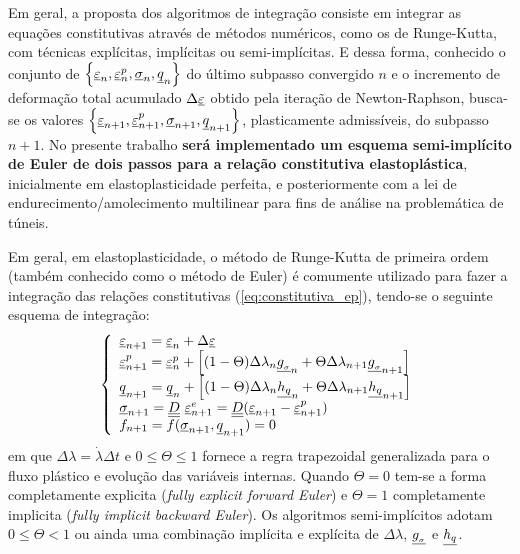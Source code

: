 Em geral, a proposta dos algoritmos de integração consiste em integrar as equações constitutivas através de métodos numéricos, como os de Runge-Kutta, com técnicas explícitas, implícitas ou semi-implícitas. E dessa forma, conhecido o conjunto de $\left\{ \underline{\varepsilon}_n, \underline{\varepsilon}_n^p,\underline \sigma_n,\underline q_n \right\}$ do último subpasso convergido $n$ e o incremento de deformação total acumulado $\Delta \underline{\varepsilon}$ obtido pela iteração de Newton-Raphson, busca-se os valores $\left\{ \underline{\varepsilon}_{n+1}, \underline{\varepsilon}_{n+1}^p,\underline \sigma_{n+1},\underline q_{n+1} \right\}$, plasticamente admissíveis, do subpasso $n+1$. No presente trabalho \textbf{será implementado um esquema semi-implícito de Euler de dois passos para a relação constitutiva elastoplástica}, inicialmente em elastoplasticidade perfeita, e posteriormente com a lei de endurecimento/amolecimento multilinear para fins de análise na problemática de túneis.

Em geral, em elastoplasticidade, o método de Runge-Kutta de primeira ordem (também conhecido como o método de Euler) é comumente utilizado para fazer a integração das relações constitutivas (\ref{eq:constitutiva_ep}), tendo-se o seguinte esquema de integração:
\begin{equation}
	\label{eq:esquema_int_constitutiva_ep}
	\left\{
	\begin{array}{lcl}
		\underline{\varepsilon}_{n+1} = \underline{\varepsilon}_n + \Delta \underline{\varepsilon} \\
		\underline{\varepsilon}_{n+1}^p = \underline{\varepsilon}_n^p + \left[(1-\Theta) \Delta \lambda_n \underline{g_{_\sigma}}_n + \Theta \Delta \lambda_{n+1} \underline{g_{_\sigma}}_{n+1}\right] \\
		\underline q_{n+1} = \underline q_n + \left[(1-\Theta) \Delta \lambda_n \underline{h_q}_n + \Theta \Delta \lambda_{n+1} \underline{h_q}_{n+1}\right] \\	
		\underline \sigma_{n+1} = \underline{\underline D}~\underline{\varepsilon}_{n+1}^e = \underline{\underline D}( \underline{\varepsilon}_{n+1} - \underline{\varepsilon}_{n+1}^p) \\
		f_{n+1} = f(\underline \sigma_{n+1},\underline q_{n+1}) = 0		
	\end{array}
	\right.
\end{equation}
em que $\Delta \lambda = \dot\lambda\Delta t$ e $0 \leq \Theta \leq 1$ fornece a regra trapezoidal generalizada para o fluxo plástico e evolução das variáveis internas. Quando $\Theta = 0$ tem-se a forma completamente explicita (\textit{fully explicit forward Euler}) e $\Theta = 1$  completamente implicita (\textit{fully implicit backward Euler}). Os algoritmos semi-implícitos adotam $0 \leq \Theta < 1$  ou ainda uma combinação implícita e explícita de $\Delta \lambda$, $\underline{g_{_\sigma}}$ e $\underline{h_q}$.

